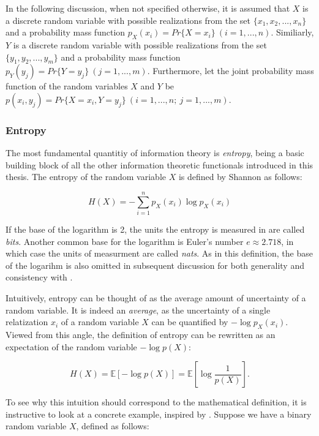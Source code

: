 \documentclass[12pt]{article}
\begin{document}
In the following discussion, when not specified otherwise, it is assumed that $X$ is a discrete random variable with possible realizations from the set $\{x_1, x_2, ..., x_n\}$ and a probability mass function $p_X(x_i) = Pr\{X = x_i\} \ (i = 1, ..., n)$. Similiarly, $Y$ is a discrete random variable with possible realizations from the set $\{y_1, y_2, ..., y_m\}$ and a probability mass function $p_Y(y_j) = Pr\{Y = y_j\} \ (j = 1, ..., m)$. Furthermore, let the joint probability mass function of the random variables $X$ and $Y$ be $p(x_i, y_j) = Pr\{X = x_i, Y = y_j\} \ (i = 1, ..., n; \ j = 1, ..., m)$. 

\subsubsection{Entropy}

The most fundamental quantitiy of information theory is \textit{entropy}, being a basic building block of all the other information theoretic functionals introduced in this thesis. The entropy of the random variable $X$ is defined by Shannon \cite{shannon} as follows: 

\begin{equation}
H(X) = -\sum_{i=1}^{n} p_X(x_i) \log p_X(x_i)
\label{eq:entropy}
\end{equation}

If the base of the logarithm is 2, the units the entropy is measured in are called \textit{bits}. Another common base for the logarithm is Euler's number $e \approx 2.718$, in which case the units of measurment are called \textit{nats}. As in this definition, the base of the logarihm is also omitted in subsequent discussion for both generality and consistency with \cite{cover-thomas}.

Intuitively, entropy can be thought of as the average amount of uncertainty of a random variable. It is indeed an \textit{average}, as the uncertainty of a single relatization $x_i$ of a random variable $X$ can be quantified by $-\log p_X(x_i)$. Viewed from this angle, the definition of entropy can be rewritten as an expectation of the random variable $-\log p(X)$: 

$$H(X) = \mathbb{E} \left[ - \log p(X) \right] = \mathbb{E} \left[ \log \frac{1}{p(X)} \right].$$

To see why this intuition should correspond to the mathematical definition, it is instructive to look at a concrete example, inspired by \cite{cover-thomas}. Suppose we have a binary random variable $X$, defined as follows: 
\end{document}
